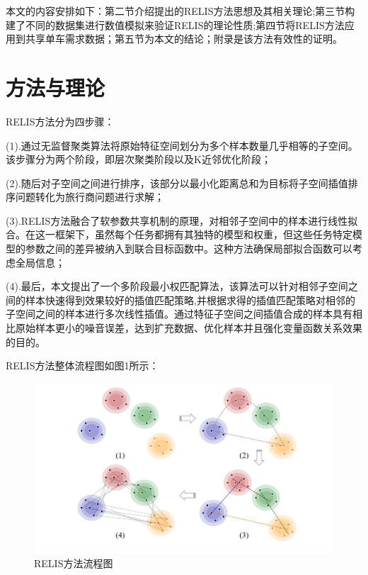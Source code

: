 \documentclass[12pt,a4paper]{article}%
\begin{document}
	本文的内容安排如下：第二节介绍提出的RELIS方法思想及其相关理论;第三节构建了不同的数据集进行数值模拟来验证RELIS的理论性质;第四节将RELIS方法应用到共享单车需求数据；第五节为本文的结论；附录是该方法有效性的证明。

	\section{方法与理论}
	RELIS方法分为四步骤：

	(1).通过无监督聚类算法将原始特征空间划分为多个样本数量几乎相等的子空间。该步骤分为两个阶段，即层次聚类阶段以及K近邻优化阶段；

	(2).随后对子空间之间进行排序，该部分以最小化距离总和为目标将子空间插值排序问题转化为旅行商问题进行求解；

	(3).RELIS方法融合了软参数共享机制的原理，对相邻子空间中的样本进行线性拟合。在这一框架下，虽然每个任务都拥有其独特的模型和权重，但这些任务特定模型的参数之间的差异被纳入到联合目标函数中。这种方法确保局部拟合函数可以考虑全局信息；

	(4).最后，本文提出了一个多阶段最小权匹配算法，该算法可以针对相邻子空间之间的样本快速得到效果较好的插值匹配策略,并根据求得的插值匹配策略对相邻的子空间之间的样本进行多次线性插值。通过特征子空间之间插值合成的样本具有相比原始样本更小的噪音误差，达到扩充数据、优化样本并且强化变量函数关系效果的目的。

	RELIS方法整体流程图如图1所示：


	\begin{figure}[H]%
		\centering
		\begin{minipage}{0.83\textwidth}%
			\centering
			\includegraphics[width=1.0%
			\textwidth]{流程图.png}%
			\caption{\fontsize{10pt}{15pt}\selectfont RELIS方法流程图}%
		\end{minipage}
	\end{figure}
\end{document}
